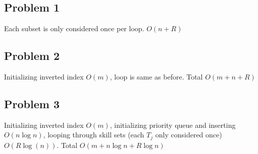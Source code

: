 \documentclass{article}
\begin{document}
\subsection*{Problem 1}
Each subset is only considered once per loop. $O(n + R)$

\subsection*{Problem 2}
Initializing inverted index $O(m)$, loop is same as before. Total $O(m + n + R)$

\subsection*{Problem 3}
Initializing inverted index $O(m)$, initializing priority queue and inserting $O(n\log n)$, looping through skill sets (each $T_j$ only considered once) $O(R\log(n))$. Total $O(m + n\log n + R\log n)$
\end{document}
